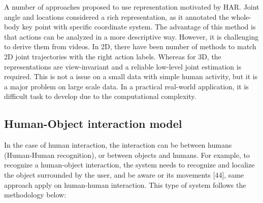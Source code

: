 A number of approaches proposed to use representation motivated by HAR. Joint angle and locations considered a rich representation, as it annotated the whole-body key point with specific coordinate system. The advantage of this method is that actions can be analyzed in a more descriptive way. However, it is challenging to derive them from videos. In 2D, there have been number of methods to match 2D joint trajectories with the right action labels. Whereas for 3D, the representations are view-invariant and a reliable low-level joint estimation is required. This is not a issue on a small data with simple human activity, but it is a major problem on large scale data. In a practical real-world application, it is difficult task to develop due to the computational complexity.


\subsection{Human-Object interaction model}
\hspace{5mm} In the case of human interaction, the interaction can be between humans (Human-Human recognition), or between objects and humans. For example, to recognize a human-object interaction, the system needs to recognize and localize the object surrounded by the user, and be aware or its movements [44], same approach apply on human-human interaction. This type of system follows the methodology below:\\

